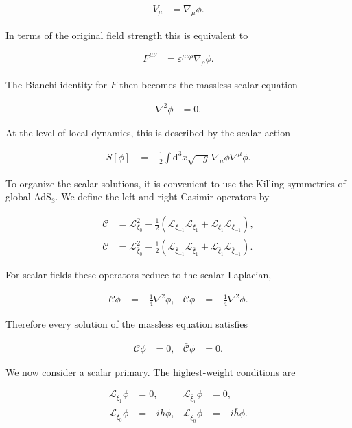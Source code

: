 \begin{align}
V_{\mu}&=\nabla_{\mu}\phi.
\end{align}

In terms of the original field strength this is equivalent to

\begin{align}
F^{\mu\nu}&=\varepsilon^{\mu\nu\rho}\nabla_{\rho}\phi.
\end{align}

The Bianchi identity for $F$ then becomes the massless scalar equation

\begin{align}
\nabla^{2}\phi&=0.
\end{align}

At the level of local dynamics, this is described by the scalar action

\begin{align}
S[\phi]&=-\frac{1}{2}\int\mathrm{d}^{3}x\sqrt{-g}\,\nabla_{\mu}\phi\nabla^{\mu}\phi.
\end{align}

To organize the scalar solutions, it is convenient to use the Killing symmetries of global AdS$_3$. We define the left and right Casimir operators by

\begin{align}
\mathcal{C}&=\mathcal{L}_{\xi_{0}}^{2}-\frac{1}{2}\left(\mathcal{L}_{\xi_{-1}}\mathcal{L}_{\xi_{1}}+\mathcal{L}_{\xi_{1}}\mathcal{L}_{\xi_{-1}}\right), \\
\bar{\mathcal{C}}&=\mathcal{L}_{\bar{\xi}_{0}}^{2}-\frac{1}{2}\left(\mathcal{L}_{\bar{\xi}_{-1}}\mathcal{L}_{\bar{\xi}_{1}}+\mathcal{L}_{\bar{\xi}_{1}}\mathcal{L}_{\bar{\xi}_{-1}}\right).
\end{align}

For scalar fields these operators reduce to the scalar Laplacian,

\begin{align}
\mathcal{C}\phi&=-\frac{1}{4}\nabla^{2}\phi, &
\bar{\mathcal{C}}\phi&=-\frac{1}{4}\nabla^{2}\phi.
\end{align}

Therefore every solution of the massless equation satisfies

\begin{align}
\mathcal{C}\phi&=0, &
\bar{\mathcal{C}}\phi&=0.
\end{align}

We now consider a scalar primary. The highest-weight conditions are

\begin{align}
\mathcal{L}_{\xi_{1}}\phi&=0, &
\mathcal{L}_{\bar{\xi}_{1}}\phi&=0, \\
\mathcal{L}_{\xi_{0}}\phi&=-ih\phi, &
\mathcal{L}_{\bar{\xi}_{0}}\phi&=-i\bar{h}\phi.
\end{align}

